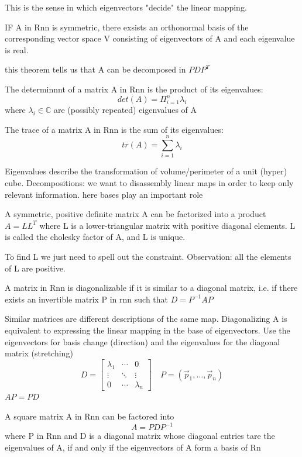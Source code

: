 This is the sense in which eigenvectors "decide" the linear mapping. 
\begin{theorem}
    IF A in Rnn is symmetric, there exsists an orthonormal basis of the corresponding vector space V consisting of eigenvectors of A and each eigenvalue is real. 
\end{theorem}
this theorem tells us that A can be decomposed in $PDP^T$
\begin{theorem}
    The determinnnt of a matrix A in Rnn is the product of its eigenvalues:
    \[ 
        det(A) = \Pi_{i=1}^{n}{\lambda_i} 
    \]
    where $\lambda_i \in \mathbb{C}$ are (possibly repeated) eigenvalues of A
\end{theorem}
\begin{theorem}
    The trace of a matrix A in Rnn is the sum of its eigenvalues:
    \[ 
         tr(A) = \sum_{i=1}^{n}{\lambda_i}
    \]
\end{theorem}
Eigenvalues describe the transformation of volume/perimeter of a unit (hyper) cube.
Decompositions: we want to disassembly linear maps in order to keep only relevant information. here bases play an important role
\begin{theorem}
    A symmetric, positive definite matrix A can be factorized into a product $A = LL^T$ where L is a lower-triangular matrix with positive diagonal elements.
    L is called the cholesky factor of A, and L is unique.
\end{theorem}
To find L we just need to spell out the constraint. Observation: all the elements of L are positive.
\begin{definition}[Diagonalizable]
    A matrix in Rnn is diagonalizable if it is similar to a diagonal matrix, i.e. if there exists an invertible matrix P in rnn such that $D = P^{-1}AP$
\end{definition}
Similar matrices are different descriptions of the same map. Diagonalizing A is equivalent to expressing the linear mapping in the base of eigenvectors. Use the eigenvectors for basis change (direction) and the eigenvalues for the diagonal matrix (stretching)
\[ 
    D =
    \begin{bmatrix}
        \lambda_1 & \cdots & 0 \\
        \vdots & \ddots & \vdots \\
        0 & \cdots & \lambda_n
    \end{bmatrix} 
    \quad P = (\vec{p}_{1}, \ldots,\vec{p}_{n})
\]
$AP = PD$ 
\begin{theorem}[Eigendecomposition]
    A square matrix A in Rnn can be factored into \[ 
        A = PDP^{-1} 
    \]
    where P in Rnn and D is a diagonal matrix whose diagonal entries tare the eigenvalues of A, if and only if the eigenvectors of A form a basis of Rn
    
\end{theorem}
